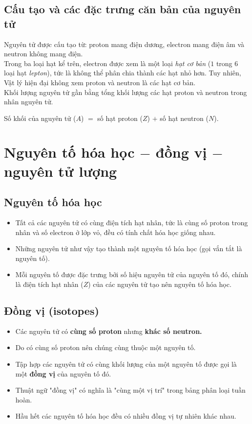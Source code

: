 \subsection{Cấu tạo và các đặc trưng căn bản của nguyên tử}
Nguyên tử được cấu tạo từ: proton mang điện dương, electron mang điện âm và neutron không mang điện.\\
Trong ba loại hạt kể trên, electron được xem là một loại \textit{hạt cơ bản} ($1$ trong $6$ loại hạt \textit{lepton}), tức là không thể phân chia thành các hạt nhỏ hơn. Tuy nhiên, Vật lý hiện đại không xem proton và neutron là các hạt cơ bản.\\
Khối lượng nguyên tử gần bằng tổng khối lượng các hạt proton và neutron trong nhân nguyên tử.\\
\centerline{Số khối của nguyên tử ($A$) $=$ số hạt proton ($Z$) $+$ số hạt neutron ($N$).}
\section{Nguyên tố hóa học $-$ đồng vị $-$ nguyên tử lượng}
\subsection{Nguyên tố hóa học}
\begin{itemize}
\item Tất cả các nguyên tử có cùng điện tích hạt nhân, tức là cùng số proton trong nhân và số electron ở lớp vỏ, đều có tính chất hóa học giống nhau.
\item Những nguyên tử như vậy tạo thành một nguyên tố hóa học (gọi vắn tắt là nguyên tố).
\item Mỗi nguyên tố được đặc trưng bởi số hiệu nguyên tử của nguyên tố đó, chính là điện tích hạt nhân ($Z$) của các nguyên tử tạo nên nguyên tố hóa học.
\end{itemize}
\subsection{Đồng vị (isotopes)}
\begin{itemize}
\item Các nguyên tử có \textbf{cùng số proton} nhưng \textbf{khác số neutron.}
\item Do có cùng số proton nên chúng cùng thuộc một nguyên tố.
\item Tập hợp các nguyên tử có cùng khối lượng của một nguyên tố được gọi là một \textbf{đồng vị} của nguyên tố đó.
\item Thuật ngữ "đồng vị" có nghĩa là "cùng một vị trí" trong bảng phân loại tuần hoàn.
\item Hầu hết các nguyên tố hóa học đều có nhiều đồng vị tự nhiên khác nhau.
\end{itemize}
